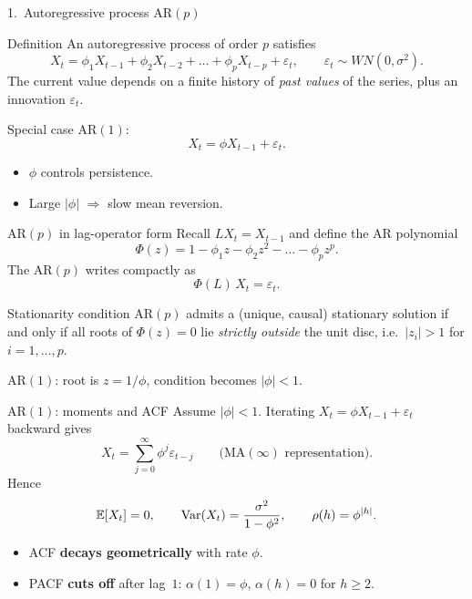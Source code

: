 \documentclass[aspectratio=169]{beamer}
\begin{document}
\begin{frame}{1.~Autoregressive process AR$(p)$}
  \begin{block}{Definition}
    An autoregressive process of order $p$ satisfies
    \[
      X_t = \phi_1 X_{t-1} + \phi_2 X_{t-2} + \dots + \phi_p X_{t-p}
            + \varepsilon_t,
      \qquad \varepsilon_t \sim WN(0, \sigma^2).
    \]
    The current value depends on a finite history of \emph{past
    values} of the series, plus an innovation $\varepsilon_t$.
  \end{block}
  \pause
  Special case AR$(1)$:
  \[
    X_t = \phi X_{t-1} + \varepsilon_t.
  \]
  \begin{itemize}
    \item $\phi$ controls persistence.
    \item Large $|\phi|$ $\Rightarrow$ slow mean reversion.
  \end{itemize}
\end{frame}

\begin{frame}{AR$(p)$ in lag-operator form}
  Recall $L X_t = X_{t-1}$ and define the AR polynomial
  \[
    \Phi(z) = 1 - \phi_1 z - \phi_2 z^2 - \dots - \phi_p z^p.
  \]
  The AR$(p)$ writes compactly as
  \[
    \Phi(L)\, X_t = \varepsilon_t.
  \]
  \begin{block}{Stationarity condition}
    AR$(p)$ admits a (unique, causal) stationary solution if and only
    if all roots of $\Phi(z) = 0$ lie \emph{strictly outside} the
    unit disc, i.e.\ $|z_i| > 1$ for $i = 1, \dots, p$.
  \end{block}
  AR$(1)$: root is $z = 1/\phi$, condition becomes $|\phi| < 1$.
\end{frame}

\begin{frame}{AR$(1)$: moments and ACF}
  Assume $|\phi| < 1$. Iterating
  $X_t = \phi X_{t-1} + \varepsilon_t$ backward gives
  \[
    X_t = \sum_{j=0}^{\infty} \phi^j \varepsilon_{t-j}
    \qquad\text{(MA$(\infty)$ representation)}.
  \]
  \pause
  Hence
  \[
    \mathbb{E}[X_t] = 0,
    \qquad
    \mathrm{Var}(X_t) = \frac{\sigma^2}{1 - \phi^2},
    \qquad
    \rho(h) = \phi^{|h|}.
  \]
  \begin{itemize}
    \item ACF \textbf{decays geometrically} with rate $\phi$.
    \item PACF \textbf{cuts off} after lag~$1$:
          $\alpha(1) = \phi$, $\alpha(h) = 0$ for $h \geq 2$.
  \end{itemize}
\end{frame}
\end{document}
